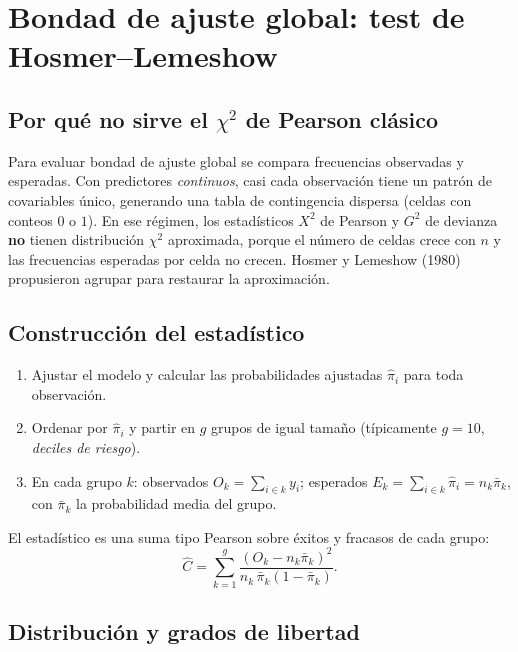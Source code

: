 \documentclass[11pt]{article}
\theoremstyle{plain}
\theoremstyle{definition}
\theoremstyle{remark}
\begin{document}
\section{Bondad de ajuste global: test de Hosmer--Lemeshow}\label{sec:hl}

\subsection{Por qué no sirve el $\chi^2$ de Pearson clásico}

Para evaluar bondad de ajuste global se compara frecuencias observadas y
esperadas. Con predictores \emph{continuos}, casi cada observación tiene un
patrón de covariables único, generando una tabla de contingencia dispersa
(celdas con conteos $0$ o $1$). En ese régimen, los estadísticos $X^2$ de
Pearson y $G^2$ de devianza \textbf{no} tienen distribución $\chi^2$
aproximada, porque el número de celdas crece con $n$ y las frecuencias
esperadas por celda no crecen. Hosmer y Lemeshow (1980) propusieron agrupar
para restaurar la aproximación.

\subsection{Construcción del estadístico}

\begin{enumerate}[label=\textbf{\arabic*.}]
  \item Ajustar el modelo y calcular las probabilidades ajustadas $\hat\pi_i$
        para toda observación.
  \item Ordenar por $\hat\pi_i$ y partir en $g$ grupos de igual tamaño
        (típicamente $g=10$, \emph{deciles de riesgo}).
  \item En cada grupo $k$: observados $O_k=\sum_{i\in k} y_i$; esperados
        $E_k=\sum_{i\in k}\hat\pi_i = n_k\bar\pi_k$, con $\bar\pi_k$ la
        probabilidad media del grupo.
\end{enumerate}
El estadístico es una suma tipo Pearson sobre éxitos y fracasos de cada grupo:
\begin{equation}
  \hat C = \sum_{k=1}^{g}
  \frac{(O_k - n_k\bar\pi_k)^2}{n_k\,\bar\pi_k(1-\bar\pi_k)}.
  \label{eq:hl}
\end{equation}

\subsection{Distribución y grados de libertad}
\end{document}
